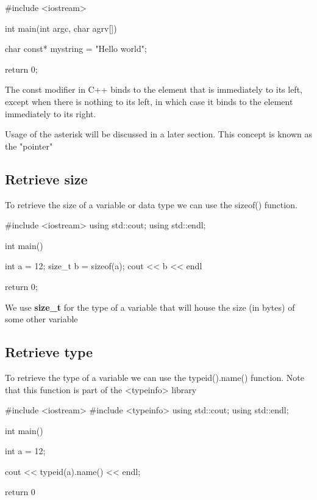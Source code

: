 \documentclass{report}
\begin{document}
    \begin{cppcode}
#include <iostream>

int main(int argc, char agrv[]){

    char const* mystring = "Hello world";

    return 0;
}
    \end{cppcode}
    
    \bigbreak \noindent 
    The const modifier in C++ binds to the element that is immediately to its left, except when there is nothing to its left, in which case it binds to the element immediately to its right.
    \bigbreak \noindent 
    \begin{notebox}
			Usage of the asterisk will be discussed in a later section. This concept is known as the "pointer"
		\end{notebox}


    \pagebreak \bigbreak \noindent 
    \subsection{Retrieve size}
    \bigbreak \noindent 
    To retrieve the size of a variable or data type we can use the sizeof() function.
    \bigbreak \noindent 
    
    \begin{cppcode}
#include <iostream>
using std::cout;
using std::endl;

int main() {
    int a = 12;
    size_t b = sizeof(a);
    cout << b << endl

    return 0;
}
    \end{cppcode}
    
    \bigbreak \noindent 
    \begin{notebox}
        We use \textbf{size\_t} for the type of a variable that will house the size (in bytes) of some other variable
    \end{notebox}

    \bigbreak \noindent \bigbreak \noindent 
    \subsection{Retrieve type}
    \bigbreak \noindent 
    To retrieve the type of a variable we can use the typeid().name() function. Note that this function is part of the <typeinfo> library
    \bigbreak \noindent 
    
    \begin{cppcode}
#include <iostream>
#include <typeinfo>
using std::cout;
using std::endl;

int main(){

    int a = 12;

    cout << typeid(a).name() << endl;

    return 0
}
    \end{cppcode}
    
\end{document}
